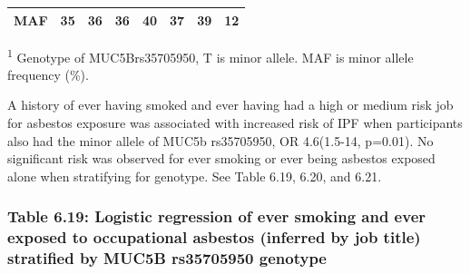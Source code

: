 \begin{longtable}[]{@{}llllllll@{}}
\begin{minipage}[t]{0.05\columnwidth}\raggedright
MAF\strut
\end{minipage} & \begin{minipage}[t]{0.05\columnwidth}\raggedright
35\strut
\end{minipage} & \begin{minipage}[t]{0.09\columnwidth}\raggedright
36\strut
\end{minipage} & \begin{minipage}[t]{0.11\columnwidth}\raggedright
36\strut
\end{minipage} & \begin{minipage}[t]{0.11\columnwidth}\raggedright
40\strut
\end{minipage} & \begin{minipage}[t]{0.15\columnwidth}\raggedright
37\strut
\end{minipage} & \begin{minipage}[t]{0.14\columnwidth}\raggedright
39\strut
\end{minipage} & \begin{minipage}[t]{0.08\columnwidth}\raggedright
12\strut
\end{minipage}\tabularnewline
\bottomrule
\end{longtable}

\textsuperscript{1} Genotype of MUC5Brs35705950, T is minor allele. MAF
is minor allele frequency (\%).

A history of ever having smoked and ever having had a high or medium
risk job for asbestos exposure was associated with increased risk of IPF
when participants also had the minor allele of MUC5b rs35705950, OR
4.6(1.5-14, p=0.01). No significant risk was observed for ever smoking
or ever being asbestos exposed alone when stratifying for genotype. See
Table 6.19, 6.20, and 6.21.

\newpage

\hypertarget{table-6.19-logistic-regression-of-ever-smoking-and-ever-exposed-to-occupational-asbestos-inferred-by-job-title-stratified-by-muc5b-rs35705950-genotype}{%
\subsubsection{Table 6.19: Logistic regression of ever smoking and ever
exposed to occupational asbestos (inferred by job title) stratified by
MUC5B rs35705950
genotype}\label{table-6.19-logistic-regression-of-ever-smoking-and-ever-exposed-to-occupational-asbestos-inferred-by-job-title-stratified-by-muc5b-rs35705950-genotype}}

